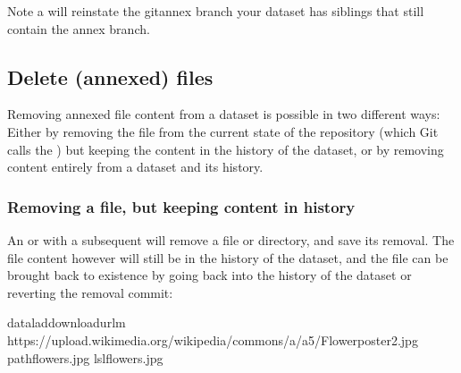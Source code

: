 \sphinxAtStartPar
Note a  will reinstate the git\sphinxhyphen{}annex branch  your dataset has siblings that still contain the annex branch.


\subsection{Delete (annexed) files}
\label{\detokenize{basics/101-136-filesystem:delete-annexed-files}}
\sphinxAtStartPar
Removing annexed file content from a dataset is possible in two different ways:
Either by removing the file from the current state of the repository
(which Git calls the ) but keeping the content in the history
of the dataset, or by removing content entirely from a dataset and its
history.

\ignorespaces 

\subsubsection{Removing a file, but keeping content in history}
\label{\detokenize{basics/101-136-filesystem:removing-a-file-but-keeping-content-in-history}}\label{\detokenize{basics/101-136-filesystem:index-15}}
\sphinxAtStartPar
An  or  with a subsequent 
will remove a file or directory, and save its removal. The file content however will
still be in the history of the dataset, and the file can be brought back to existence
by going back into the history of the dataset or reverting the removal commit:

\begin{sphinxVerbatim}[commandchars=\\\{\}]
dataladdownload\PYGZhy{}url\PYGZhy{}m
https://upload.wikimedia.org/wikipedia/commons/a/a5/Flower\PYGZus{}poster\PYGZus{}2.jpg
\PYGZhy{}\PYGZhy{}pathflowers.jpg
ls\PYGZhy{}lflowers.jpg
\end{sphinxVerbatim}

